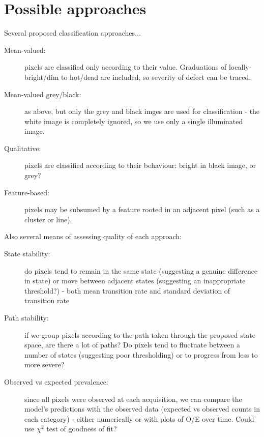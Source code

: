 \documentclass[10pt,fleqn]{article}
\begin{document}
\section*{Possible approaches}

Several proposed classification approaches...

\begin{description}
\item[Mean-valued:] pixels are classified only according to their value. Graduations of locally-bright/dim to hot/dead are included, so severity of defect can be traced.

\item[Mean-valued grey/black:] as above, but only the grey and black imges are used for classification - the white image is completely ignored, so we use only a single illuminated image.

\item[Qualitative:] pixels are classified according to their behaviour: bright in black image, or grey?

\item[Feature-based:] pixels may be subsumed by a feature rooted in an adjacent pixel (such as a cluster or line).
\end{description}

\vspace{15pt}

Also several means of assessing quality of each approach:

\begin{description}

\item[State stability:] do pixels tend to remain in the same state (suggesting a genuine difference in state) or move between adjacent states (suggesting an inappropriate threshold?) - both mean transition rate and standard deviation of transition rate

\item[Path stability:] if we group pixels according to the path taken through the proposed state space, are there a lot of paths? Do pixels tend to fluctuate between a number of states (suggesting poor thresholding) or to progress from less to more severe?

\item[Observed vs expected prevalence:] since all pixels were observed at each acquisition, we can compare the model's predictions with the observed data (expected vs observed counts in each category) - either numerically or with plots of O/E over time. Could use $\chi^2$ test of goodness of fit?
\end{description}
\end{document}

